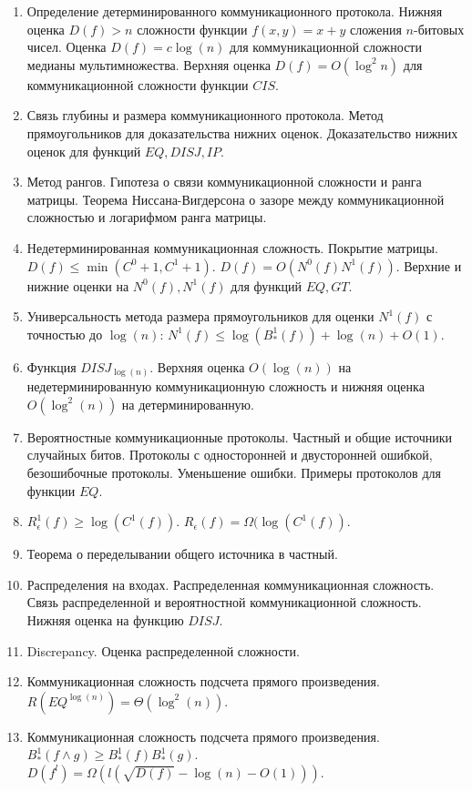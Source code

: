 \begin{enumerate}
    
	\item Определение детерминированного коммуникационного протокола. Нижняя оценка $D(f) > n$ сложности функции $f(x, y) = x + y$
		сложения $n$-битовых чисел. Оценка $D(f) = c \log(n)$ для коммуникационной сложности медианы мультимножества. Верхняя
        оценка $D(f) = O(\log^2 n)$ для коммуникационной сложности функции $CIS$.
    \item Связь глубины и размера коммуникационного протокола. Метод прямоугольников для доказательства нижних
		оценок. Доказательство нижних оценок для функций $EQ, DISJ, IP$.
	\item Метод рангов. Гипотеза о связи коммуникационной сложности и ранга матрицы. Теорема Ниссана-Вигдерсона о зазоре между
		коммуникационной сложностью и логарифмом ранга матрицы.


    \item Недетерминированная коммуникационная сложность. Покрытие матрицы. $D(f) \le \min(C^0 + 1, C^1 + 1)$. $D(f) =
		O(N^0(f) N^1(f))$. Верхние и нижние оценки на $N^0(f), N^1(f)$ для функций $EQ, GT$.
    \item Универсальность метода размера прямоугольников для оценки $N^1(f)$ с точностью до $\log(n)$: $N^1(f) \le \log(B^1_*(f))
		+ \log(n) + O(1)$.
	\item Функция $DISJ_{\log(n)}$. Верхняя оценка $O(\log(n))$ на недетерминированную коммуникационную сложность и нижняя оценка
		$O(\log^2(n))$ на детерминированную.

    \item Вероятностные коммуникационные протоколы. Частный и общие источники случайных битов. Протоколы с односторонней и
		двусторонней ошибкой, безошибочные протоколы. Уменьшение ошибки. Примеры протоколов для функции $EQ$.
    \item $R^1_{\epsilon}(f) \ge \log(C^1(f))$. $R_{\epsilon}(f) = \Omega(\log(C^1(f))$.
	\item Теорема о переделывании общего источника в частный.
    \item Распределения на входах. Распределенная коммуникационная сложность. Связь распределенной и вероятностной коммуникационной
		сложность. Нижняя оценка на функцию $DISJ$.
    \item Discrepancy. Оценка распределенной сложности.
 
    \item Коммуникационная сложность подсчета прямого произведения. $R(EQ^{\log(n)}) = \Theta(\log^{2}(n))$.
	\item Коммуникационная сложность подсчета прямого произведения. $B^1_*(f \land g) \ge B^1_*(f) B^1_*(g)$. $D(f^l) = \Omega(l
		(\sqrt{D(f)} - \log(n) - O(1)))$.



\end{enumerate}
